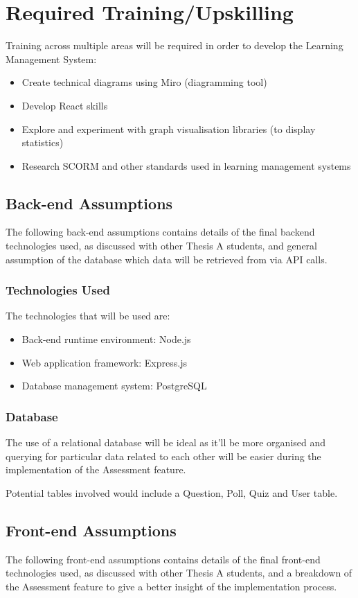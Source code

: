 \section{Required Training/Upskilling}
Training across multiple areas will be required in order to develop the Learning Management System:

\begin{itemize}
	\item Create technical diagrams using Miro (diagramming tool)
	\item Develop React skills
	\item Explore and experiment with graph visualisation libraries (to display statistics)
	\item Research SCORM and other standards used in learning management systems
\end{itemize}


\subsection{Back-end Assumptions}
The following back-end assumptions contains details of the final backend technologies used, as discussed with other Thesis A students, and general assumption of the database which data will be retrieved from via API calls. 

\subsubsection{Technologies Used}
The technologies that will be used are:
\begin{itemize}
	\item Back-end runtime environment: Node.js
	\item Web application framework: Express.js
	\item Database management system: PostgreSQL
\end{itemize}

\subsubsection{Database}
The use of a relational database will be ideal as it'll be more organised and querying for particular data related to each other will be easier during the implementation of the Assessment feature. 

Potential tables involved would include a Question, Poll, Quiz and User table. 


\subsection{Front-end Assumptions}
The following front-end assumptions contains details of the final front-end technologies used, as discussed with other Thesis A students, and a breakdown of the Assessment feature to give a better insight of the implementation process.

